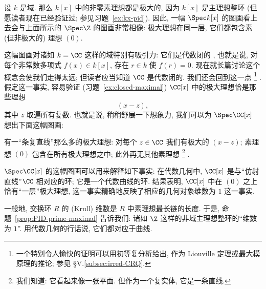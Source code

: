 \begin{example}
\label{ex:spec-kx}
设 $k$ 是域. 那么 $k[x]$ 中的非零素理想都是极大的, 因为 $k[x]$ 是主理想整环 (但愿读者现在已经验证过; 参见习题~\ref{ex:kx-pid}). 因此, 一幅 $\Spec k[x]$ 的图画看上去会与上面所示的 $\Spec \Z$ 的图画非常相像: 极大理想在同一层, 它们都包含素 (但非极大的) 理想 $(0)$.

这幅图画对诸如 $k = \CC$ 这样的域特别有吸引力: 它们是代数闭的%
, 也就是说, 对每个非常数多项式 $f(x) \in k[x]$, 存在 $r \in k$ 使 $f(r) = 0$. 现在就长篇讨论这个概念会使我们走得太远; 但读者应当知道 $\CC$ 是代数闭的. 我们还会回到这一点%
\footnote{一个特别令人愉快的证明可以用初等复分析给出, 作为 Liouville 定理或最大模原理的推论; 参见 \S V.\ref{subsec:irred-CRQ}.}%
. 假定这一事实, 容易验证 (习题~\ref{ex:closed-maximal}) $\CC[x]$ 中的极大理想恰是那些理想
\[
(x - z),
\]
其中 $z$ 取遍所有复数. 也就是说, 稍稍舒展一下想象力, 我们可以为 $\Spec \CC[x]$ 想出下面这幅图画:
\begin{center}
\end{center}
有一``条复直线''那么多的极大理想: 对每个 $z \in \CC$ 我们有极大的 $(x - z)$; 素理想 $(0)$ 包含在所有极大理想之中; 此外再无其他素理想%
\footnote{我们知道: 它看起来像一张平面. 但作为一个复实体, 它是一条直线.}%
.

$\Spec \CC[x]$ 的这幅图画可以用来解释如下事实: 在代数几何中, $\CC[x]$ 是与``仿射直线''$\CC$ 相对应的环; 它是一个代数曲线的环. 结果表明, $\CC[x]$ 中在 $(0)$ 之上恰有``一层''极大理想, 这一事实精确地反映了相应的几何对象维数为 $1$ 这一事实.

一般地, 交换环 $R$ 的 (Krull) 维数是 $R$ 中素理想最长链的长度. 于是, 命题~\ref{prop:PID-prime-maximal} 告诉我们: 诸如 $\Z$ 这样的非域主理想整环的``维数为 $1$''. 用代数几何的行话说, 它们都对应于曲线.
\end{example}


